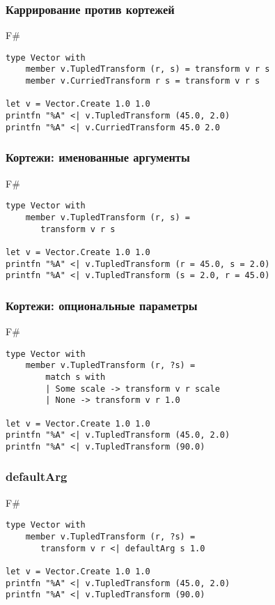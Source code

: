 \documentclass[xetex,mathserif,serif]{beamer}
\begin{document}
	\begin{frame}[fragile]
		\frametitle{Каррирование против кортежей}
		\begin{exampleblock}{F\#}
			\begin{verbatim}
type Vector with
    member v.TupledTransform (r, s) = transform v r s
    member v.CurriedTransform r s = transform v r s

let v = Vector.Create 1.0 1.0
printfn "%A" <| v.TupledTransform (45.0, 2.0)
printfn "%A" <| v.CurriedTransform 45.0 2.0
			\end{verbatim}
		\end{exampleblock}
\end{frame}

	\begin{frame}[fragile]
		\frametitle{Кортежи: именованные аргументы}
		\begin{exampleblock}{F\#}
			\begin{verbatim}
type Vector with
    member v.TupledTransform (r, s) = 
       transform v r s

let v = Vector.Create 1.0 1.0
printfn "%A" <| v.TupledTransform (r = 45.0, s = 2.0)
printfn "%A" <| v.TupledTransform (s = 2.0, r = 45.0)
			\end{verbatim}
		\end{exampleblock}
\end{frame}

	\begin{frame}[fragile]
		\frametitle{Кортежи: опциональные параметры}
		\begin{exampleblock}{F\#}
			\begin{verbatim}
type Vector with
    member v.TupledTransform (r, ?s) = 
        match s with
        | Some scale -> transform v r scale
        | None -> transform v r 1.0

let v = Vector.Create 1.0 1.0
printfn "%A" <| v.TupledTransform (45.0, 2.0)
printfn "%A" <| v.TupledTransform (90.0)
			\end{verbatim}
		\end{exampleblock}
\end{frame}

	\begin{frame}[fragile]
		\frametitle{defaultArg}
		\begin{exampleblock}{F\#}
			\begin{verbatim}
type Vector with
    member v.TupledTransform (r, ?s) = 
       transform v r <| defaultArg s 1.0

let v = Vector.Create 1.0 1.0
printfn "%A" <| v.TupledTransform (45.0, 2.0)
printfn "%A" <| v.TupledTransform (90.0)
			\end{verbatim}
		\end{exampleblock}
\end{frame}
\end{document}
